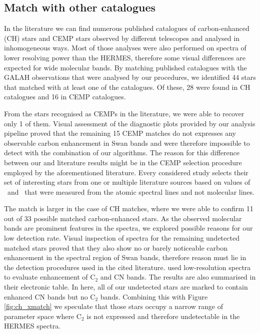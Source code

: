 \subsection{Match with other catalogues}
In the literature we can find numerous published catalogues of carbon-enhanced (CH) stars \citep{2001A&A...375..366C, 2001BaltA..10....1A,2016ApJS..226....1J} and CEMP stars \citep{2007ApJ...658..367K, 2010A&A...509A..93M, 2010AJ....139.1051P, 2014ApJ...797...21P, 2015A&A...581A..22A, 2017yCat..18330020Y} observed by different telescopes and analysed in inhomogeneous ways. Most of those analyses were also performed on spectra of lower resolving power than the HERMES, therefore some visual differences are expected for wide molecular bands. By matching published catalogues with the GALAH observations that were analysed by our procedures, we identified 44 stars that matched with at least one of the catalogues. Of these, 28 were found in CH catalogues and 16 in CEMP catalogues.

From the stars recognised as CEMPs in the literature, we were able to recover only 1 of them. Visual assessment of the diagnostic plots provided by our analysis pipeline proved that the remaining 15 CEMP matches do not expresses any observable carbon enhancement in Swan bands and were therefore impossible to detect with the combination of our algorithms. The reason for this difference between our and literature results might be in the CEMP selection procedure employed by the aforementioned literature. Every considered study selects their set of interesting stars from one or multiple literature sources based on values of \Meh\ and \Cfe\ that were measured from the atomic spectral lines and not molecular lines. 

The match is larger in the case of CH matches, where we were able to confirm 11 out of 33 possible matched carbon-enhanced stars. As the observed molecular bands are prominent features in the spectra, we explored possible reasons for our low detection rate. Visual inspection of spectra for the remaining undetected matched stars proved that they also show no or barely noticeable carbon enhancement in the spectral region of Swan bands, therefore reason must lie in the detection procedures used in the cited literature. \citet{2001A&A...375..366C} used low-resolution spectra to evaluate enhancement of C$_2$ and CN bands. The results are also summarised in their electronic table. In here, all of our undetected stars are marked to contain enhanced CN bands but no C$_2$ bands. Combining this with Figure \ref{fig:ch_xmatch} we speculate that those stars occupy a narrow range of parameter space where C$_2$ is not expressed and therefore undetectable in the HERMES spectra. 

